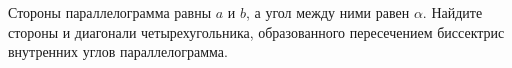 \begin{ex}
	\begin{condition}
		Стороны параллелограмма равны \( a  \) и \( b \), а угол между ними равен \( \alpha \). Найдите стороны и диагонали четырехугольника, образованного пересечением биссектрис внутренних углов параллелограмма.
	\end{condition}
\end{ex}